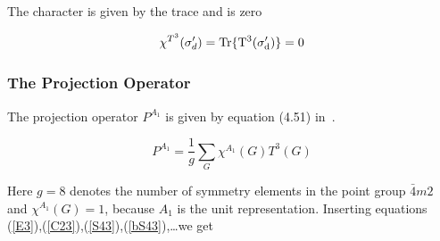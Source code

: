The character is given by the trace and is zero

\begin{equation}
\chi^{T^3}(\sigma'_d)=\rm Tr \{ T^3(\sigma'_d) \}=0
\end{equation}




\subsubsection{The Projection Operator}
The projection operator $P^{A_1}$ is given by equation (4.51) in~\cite{elliott79-1}.

\begin{equation}
P^{A_1}=\frac{1}{g} \sum_G \chi^{A_1}(G) T^3(G)
\end{equation}

Here $g=8$ denotes the number of symmetry elements in the point group $\bar 4 m 2$ and
$\chi^{A_1}(G)=1$, because $A_1$ is the unit representation.
Inserting equations (\ref{E3}),(\ref{C23}),(\ref{S43}),(\ref{bS43}),\dots we get

